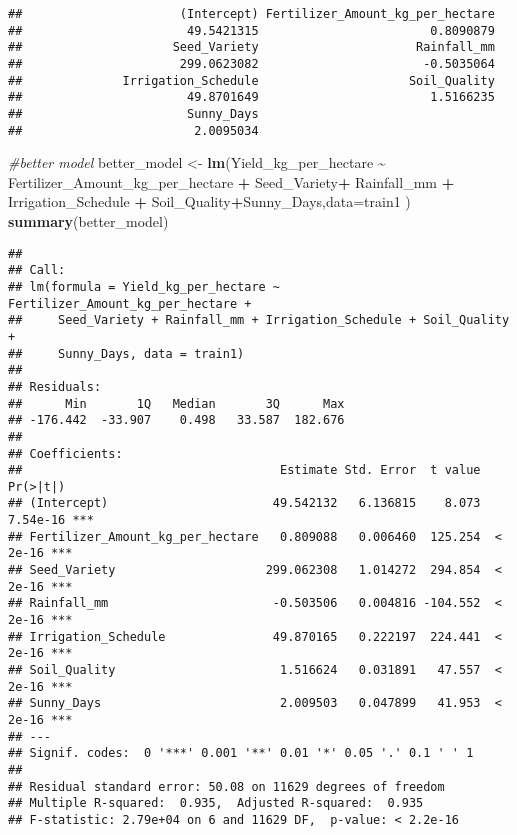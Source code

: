 \documentclass[
]{article}
\newenvironment{Shaded}{\begin{snugshade}}{\end{snugshade}}
\newcommand{\AttributeTok}[1]{\textcolor[rgb]{0.13,0.29,0.53}{#1}}
\newcommand{\CommentTok}[1]{\textcolor[rgb]{0.56,0.35,0.01}{\textit{#1}}}
\newcommand{\FunctionTok}[1]{\textcolor[rgb]{0.13,0.29,0.53}{\textbf{#1}}}
\newcommand{\NormalTok}[1]{#1}
\newcommand{\OtherTok}[1]{\textcolor[rgb]{0.56,0.35,0.01}{#1}}
\newcommand{\SpecialCharTok}[1]{\textcolor[rgb]{0.81,0.36,0.00}{\textbf{#1}}}
\begin{document}
\begin{verbatim}
##                      (Intercept) Fertilizer_Amount_kg_per_hectare 
##                       49.5421315                        0.8090879 
##                     Seed_Variety                      Rainfall_mm 
##                      299.0623082                       -0.5035064 
##              Irrigation_Schedule                     Soil_Quality 
##                       49.8701649                        1.5166235 
##                       Sunny_Days 
##                        2.0095034
\end{verbatim}

\begin{Shaded}
\begin{Highlighting}[]
\CommentTok{\#better model}
\NormalTok{better\_model }\OtherTok{\textless{}{-}} \FunctionTok{lm}\NormalTok{(Yield\_kg\_per\_hectare }\SpecialCharTok{\textasciitilde{}}\NormalTok{ Fertilizer\_Amount\_kg\_per\_hectare }\SpecialCharTok{+}\NormalTok{ Seed\_Variety}\SpecialCharTok{+}\NormalTok{ Rainfall\_mm }\SpecialCharTok{+}\NormalTok{ Irrigation\_Schedule }\SpecialCharTok{+}\NormalTok{ Soil\_Quality}\SpecialCharTok{+}\NormalTok{Sunny\_Days,}\AttributeTok{data=}\NormalTok{train1 )}
\FunctionTok{summary}\NormalTok{(better\_model)}
\end{Highlighting}
\end{Shaded}

\begin{verbatim}
## 
## Call:
## lm(formula = Yield_kg_per_hectare ~ Fertilizer_Amount_kg_per_hectare + 
##     Seed_Variety + Rainfall_mm + Irrigation_Schedule + Soil_Quality + 
##     Sunny_Days, data = train1)
## 
## Residuals:
##      Min       1Q   Median       3Q      Max 
## -176.442  -33.907    0.498   33.587  182.676 
## 
## Coefficients:
##                                    Estimate Std. Error  t value Pr(>|t|)    
## (Intercept)                       49.542132   6.136815    8.073 7.54e-16 ***
## Fertilizer_Amount_kg_per_hectare   0.809088   0.006460  125.254  < 2e-16 ***
## Seed_Variety                     299.062308   1.014272  294.854  < 2e-16 ***
## Rainfall_mm                       -0.503506   0.004816 -104.552  < 2e-16 ***
## Irrigation_Schedule               49.870165   0.222197  224.441  < 2e-16 ***
## Soil_Quality                       1.516624   0.031891   47.557  < 2e-16 ***
## Sunny_Days                         2.009503   0.047899   41.953  < 2e-16 ***
## ---
## Signif. codes:  0 '***' 0.001 '**' 0.01 '*' 0.05 '.' 0.1 ' ' 1
## 
## Residual standard error: 50.08 on 11629 degrees of freedom
## Multiple R-squared:  0.935,  Adjusted R-squared:  0.935 
## F-statistic: 2.79e+04 on 6 and 11629 DF,  p-value: < 2.2e-16
\end{verbatim}
\end{document}
